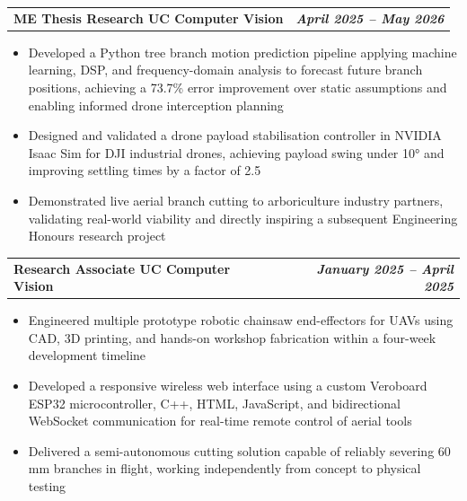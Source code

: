 \documentclass[11pt, a4paper]{article}
\makeatletter
\newcommand{\cventry}[2]{%
  \vspace{2pt}%
  \noindent
  \begin{tabularx}{\linewidth}{@{}X r@{}}
    \textbf{#1} & \textbf{\textit{#2}}
  \end{tabularx}%
  \vspace{1pt}%
}
\makeatother
\begin{document}
\cventry{ME Thesis Research \textbar{} UC Computer Vision}{April 2025 – May 2026}
\begin{itemize}
  \item Developed a Python tree branch motion prediction pipeline applying machine
        learning, DSP, and frequency-domain analysis to forecast future branch
        positions, achieving a 73.7\% error improvement over static assumptions and
        enabling informed drone interception planning
  \item Designed and validated a drone payload stabilisation controller in NVIDIA Isaac
        Sim for DJI industrial drones, achieving payload swing under 10° and improving
        settling times by a factor of 2.5
  \item Demonstrated live aerial branch cutting to arboriculture industry partners,
        validating real-world viability and directly inspiring a subsequent Engineering
        Honours research project
\end{itemize}

\cventry{Research Associate \textbar{} UC Computer Vision}{January 2025 – April 2025}
\begin{itemize}
  \item Engineered multiple prototype robotic chainsaw end-effectors for UAVs using
        CAD, 3D printing, and hands-on workshop fabrication within a four-week
        development timeline
  \item Developed a responsive wireless web interface using a custom Veroboard ESP32
        microcontroller, C++, HTML, JavaScript, and bidirectional WebSocket
        communication for real-time remote control of aerial tools
  \item Delivered a semi-autonomous cutting solution capable of reliably severing
        60\,mm branches in flight, working independently from concept to physical
        testing
\end{itemize}
\end{document}
